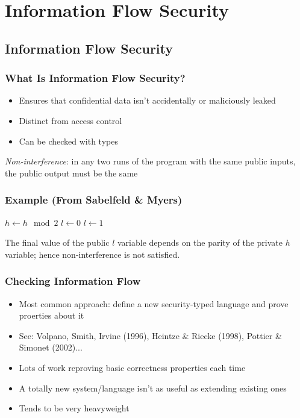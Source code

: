 \documentclass{beamer}
\begin{document}
\section{Information Flow Security}
\subsection{Information Flow Security}
\begin{frame}
  \frametitle{What Is Information Flow Security?}
  \begin{itemize}
    \item Ensures that confidential data isn't accidentally or maliciously
          leaked
    \pause
    \item Distinct from access control
    \pause
    \item Can be checked with types
  \end{itemize}
  \pause
  \begin{definition}
    \emph{Non-interference}: in any two runs of the program with the same
    public inputs, the public output must be the same
  \end{definition}
\end{frame}
\begin{frame}[fragile]
  \frametitle{Example (From Sabelfeld \& Myers)}
  \begin{algorithmic}
    \State $h \gets h \mod 2$
    \State $l \gets 0$
      \State $l \gets 1$
    \EndIf
  \end{algorithmic}
  \pause
  \vspace{5mm}
  The final value of the public $l$ variable depends on the parity of the
  private $h$ variable; hence non-interference is not satisfied.
\end{frame}
\begin{frame}
  \frametitle{Checking Information Flow}
  \begin{itemize}
    \item Most common approach: define a new security-typed language and
          prove proerties about it
    \pause
    \item See: Volpano, Smith, Irvine (1996), Heintze \& Riecke (1998),
          Pottier \& Simonet (2002)...
    \pause
    \item Lots of work reproving basic correctness properties each time
    \pause
    \item A totally new system/language isn't as useful as extending
          existing ones
    \pause
    \item Tends to be very heavyweight
  \end{itemize}
\end{frame}
\end{document}
